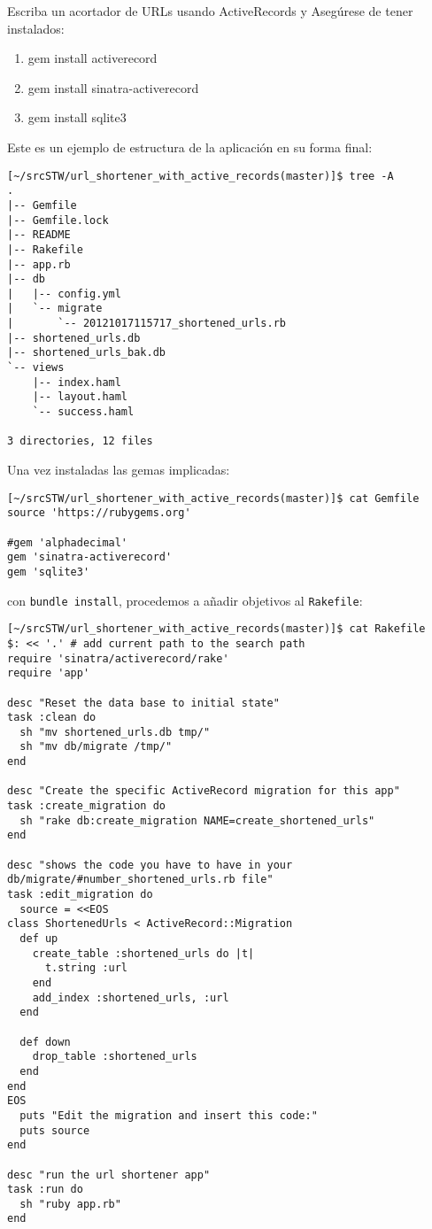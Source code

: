 \label{sectionpractica:abreviarurl}
Escriba un acortador de URLs usando ActiveRecords y 
Asegúrese de tener instalados:
\begin{enumerate}
\item gem install activerecord
\item gem install sinatra-activerecord
\item gem install sqlite3
\end{enumerate}
Este es un ejemplo de estructura de la aplicación en su forma final:
\begin{verbatim}
[~/srcSTW/url_shortener_with_active_records(master)]$ tree -A
.
|-- Gemfile
|-- Gemfile.lock
|-- README
|-- Rakefile
|-- app.rb
|-- db
|   |-- config.yml
|   `-- migrate
|       `-- 20121017115717_shortened_urls.rb
|-- shortened_urls.db
|-- shortened_urls_bak.db
`-- views
    |-- index.haml
    |-- layout.haml
    `-- success.haml

3 directories, 12 files

\end{verbatim}
Una vez instaladas las gemas implicadas:
\begin{verbatim}
[~/srcSTW/url_shortener_with_active_records(master)]$ cat Gemfile
source 'https://rubygems.org'

#gem 'alphadecimal'
gem 'sinatra-activerecord'
gem 'sqlite3'
\end{verbatim}
con \verb|bundle install|,
procedemos a añadir objetivos al \verb|Rakefile|:
\begin{verbatim}
[~/srcSTW/url_shortener_with_active_records(master)]$ cat Rakefile 
$: << '.' # add current path to the search path
require 'sinatra/activerecord/rake'
require 'app'

desc "Reset the data base to initial state"
task :clean do
  sh "mv shortened_urls.db tmp/"
  sh "mv db/migrate /tmp/"
end

desc "Create the specific ActiveRecord migration for this app"
task :create_migration do
  sh "rake db:create_migration NAME=create_shortened_urls"
end

desc "shows the code you have to have in your db/migrate/#number_shortened_urls.rb file"
task :edit_migration do
  source = <<EOS
class ShortenedUrls < ActiveRecord::Migration
  def up
    create_table :shortened_urls do |t|
      t.string :url
    end
    add_index :shortened_urls, :url
  end

  def down
    drop_table :shortened_urls
  end
end
EOS
  puts "Edit the migration and insert this code:"
  puts source
end

desc "run the url shortener app"
task :run do
  sh "ruby app.rb"
end

\end{verbatim}
